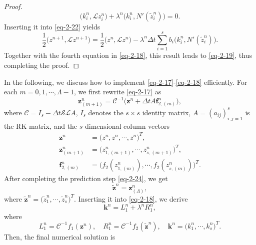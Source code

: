 \documentclass[onefignum,onetabnum]{siamart}
\begin{document}
\begin{proof}
\begin{equation*}
\big(k_i^n,\mathcal{L}z_i^n\big)+\lambda^n\big(k_i^n,N'(\tilde{z}_i^n)\big)=0.
\end{equation*}
Inserting it into \eqref{eq-2-22} yields
\begin{equation*}
	\frac{1}{2}\big(z^{n+1},\mathcal{L}z^{n+1}\big)=\frac{1}{2}\big(z^n,\mathcal{L}z^n\big)-\lambda^n\Delta t\sum_{i=1}^sb_i\big(k_i^n,N'(\tilde{z}_i^n)\big).
\end{equation*} 
Together with the fourth equation in \eqref{eq-2-18}, this result leads to \eqref{eq-2-19}, thus completing the proof.
\end{proof}

In the following, we discuss how to implement \eqref{eq-2-17}-\eqref{eq-2-18} efficiently. For each $m=0,1,\cdots,\Lambda-1$, we first rewrite \eqref{eq-2-17} as
\begin{equation}\label{eq-2-24}
	\textbf{z}_{(m+1)}^n=\mathcal{C}^{-1}\big(\textbf{z}^n+\Delta tA\textbf{f}_{2,(m)}^n\big),
\end{equation}
where $\mathcal{C}=I_s-\Delta t\mathcal{S}\mathcal{L}A$, $I_s$ denotes the $s\times s$ identity matrix, $A=(a_{ij})_{i,j=1}^s$ is the RK matrix, and the $s$-dimensional column vectors
\begin{equation*}
	\begin{aligned}
		\textbf{z}^n&=\big(z^n,z^n,\cdots,z^n\big)^T,\\
		\textbf{z}_{(m+1)}^n&=\big(z_{1,(m+1)}^n,\cdots,z_{s,(m+1)}^n\big)^T,\\
		\textbf{f}_{2,(m)}^n&=\big(f_2(z_{1,(m)}^n),\cdots,f_2(z_{s,(m)}^n)\big)^T.
	\end{aligned}
\end{equation*}
After completing the prediction step \eqref{eq-2-24}, we get
\begin{equation*}
\tilde{\textbf{z}}^n=\textbf{z}_{(\Lambda)}^n,
\end{equation*}
where $\tilde{\textbf{z}}^n=\big(\tilde{z}_1^n,\cdots,\tilde{z}_s^n\big)^T$. Inserting it into \eqref{eq-2-18}, we derive
\begin{equation*}
	\textbf{k}^n=L_1^n+\lambda^nR_1^n,
\end{equation*}
where 
\begin{equation}\label{eq-2-25}
	L_1^n=\mathcal{C}^{-1}f_1(\textbf{z}^n),\quad R_1^n=\mathcal{C}^{-1}f_2(\tilde{\textbf{z}}^n),\quad \textbf{k}^n=\big(k_1^n,\cdots,k_s^n\big)^T.
\end{equation}
Then, the final numerical solution is
\end{document}
